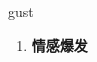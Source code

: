 
\begin{frame}
{\huge gust}
\begin{center}
\begin{enumerate}\Large
  \item \textbf{情感爆发}
\end{enumerate}
\end{center}
\end{frame}
